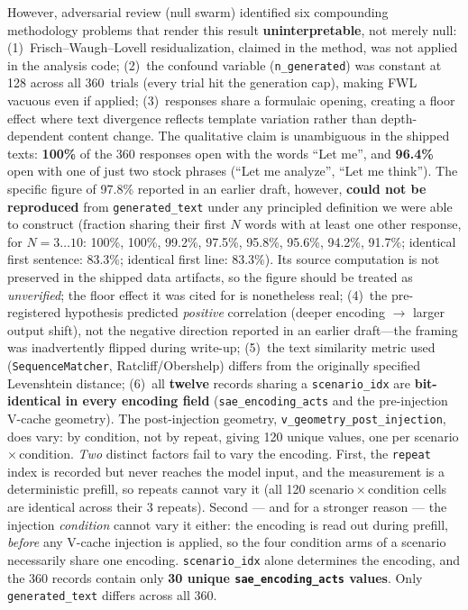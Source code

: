 \documentclass[11pt,a4paper]{article}
\begin{document}
However, adversarial review (null swarm) identified six compounding
methodology problems that render this result \textbf{uninterpretable},
not merely null:
(1)~Frisch--Waugh--Lovell residualization, claimed in the method, was not
applied in the analysis code;
(2)~the confound variable (\texttt{n\_generated}) was constant at 128
across all 360~trials (every trial hit the generation cap), making FWL
vacuous even if applied;
(3)~responses share a formulaic opening, creating a floor effect
where text divergence reflects template variation rather than
depth-dependent content change. The qualitative claim is unambiguous in the
shipped texts: \textbf{100\%} of the 360 responses open with the words
``Let me'', and \textbf{96.4\%} open with one of just two stock phrases
(``Let me analyze'', ``Let me think''). The specific figure of 97.8\%
reported in an earlier draft, however, \textbf{could not be reproduced} from
\texttt{generated\_text} under any principled definition we were able to
construct (fraction sharing their first $N$ words with at least one other
response, for $N{=}3\ldots10$: 100\%, 100\%, 99.2\%, 97.5\%, 95.8\%, 95.6\%,
94.2\%, 91.7\%; identical first sentence: 83.3\%; identical first line:
83.3\%). Its source computation is not preserved in the shipped data
artifacts, so the figure should be treated as \emph{unverified}; the floor
effect it was cited for is nonetheless real;
(4)~the pre-registered hypothesis predicted \emph{positive} correlation
(deeper encoding $\to$ larger output shift), not the negative direction
reported in an earlier draft---the framing was inadvertently flipped during
write-up;
(5)~the text similarity metric used (\texttt{SequenceMatcher},
Ratcliff/Obershelp) differs from the originally specified Levenshtein
distance;
(6)~\label{sec:pseudorep}all \textbf{twelve} records sharing a
\texttt{scenario\_idx} are \textbf{bit-identical in every encoding field}
(\texttt{sae\_encoding\_acts} and the pre-injection V-cache geometry). The
post-injection geometry, \texttt{v\_geometry\_post\_injection}, does vary: by
condition, not by repeat, giving 120 unique values, one per
scenario\,$\times$\,condition. \emph{Two} distinct factors fail to vary the encoding. First, the
\texttt{repeat} index is recorded but never reaches the model input, and the
measurement is a deterministic prefill, so repeats cannot vary it (all 120
scenario\,$\times$\,condition cells are identical across their 3 repeats).
Second --- and for a stronger reason --- the injection \emph{condition} cannot
vary it either: the encoding is read out during prefill, \emph{before} any
V-cache injection is applied, so the four condition arms of a scenario
necessarily share one encoding. \texttt{scenario\_idx} alone determines the
encoding, and the 360 records contain only \textbf{30 unique
\texttt{sae\_encoding\_acts} values}. Only \texttt{generated\_text} differs
across all 360.
\end{document}
